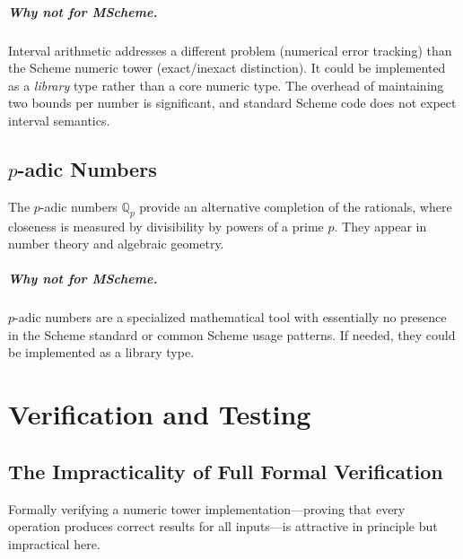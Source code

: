 \documentclass[12pt]{report}
\begin{document}
\paragraph{Why not for MScheme.}
Interval arithmetic addresses a different problem (numerical error
tracking) than the Scheme numeric tower (exact/inexact distinction).
It could be implemented as a \emph{library} type rather than a core
numeric type.  The overhead of maintaining two bounds per number is
significant, and standard Scheme code does not expect interval
semantics.

\section{$p$-adic Numbers}

The $p$-adic numbers $\mathbb{Q}_p$ provide an alternative
completion of the rationals, where closeness is measured by
divisibility by powers of a prime $p$.  They appear in number
theory and algebraic geometry.

\paragraph{Why not for MScheme.}
$p$-adic numbers are a specialized mathematical tool with essentially
no presence in the Scheme standard or common Scheme usage patterns.
If needed, they could be implemented as a library type.

\chapter{Verification and Testing}
\label{ch:testing}

\section{The Impracticality of Full Formal Verification}

Formally verifying a numeric tower implementation---proving that
every operation produces correct results for all inputs---is
attractive in principle but impractical here.
\end{document}
